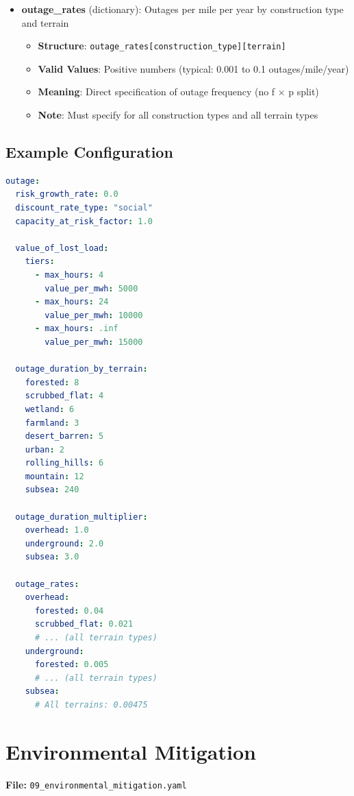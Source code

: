 \documentclass[ctcc_full_documentation.tex]{subfiles}
\begin{document}
\begin{itemize}
    \item \textbf{outage\_rates} (dictionary): Outages per mile per year by construction type and terrain
    \begin{itemize}
        \item \textbf{Structure}: \texttt{outage\_rates[construction\_type][terrain]}
        \item \textbf{Valid Values}: Positive numbers (typical: 0.001 to 0.1 outages/mile/year)
        \item \textbf{Meaning}: Direct specification of outage frequency (no f × p split)
        \item \textbf{Note}: Must specify for all construction types and all terrain types
    \end{itemize}
\end{itemize}

\subsection{Example Configuration}

\begin{lstlisting}[language=yaml]
outage:
  risk_growth_rate: 0.0
  discount_rate_type: "social"
  capacity_at_risk_factor: 1.0

  value_of_lost_load:
    tiers:
      - max_hours: 4
        value_per_mwh: 5000
      - max_hours: 24
        value_per_mwh: 10000
      - max_hours: .inf
        value_per_mwh: 15000

  outage_duration_by_terrain:
    forested: 8
    scrubbed_flat: 4
    wetland: 6
    farmland: 3
    desert_barren: 5
    urban: 2
    rolling_hills: 6
    mountain: 12
    subsea: 240

  outage_duration_multiplier:
    overhead: 1.0
    underground: 2.0
    subsea: 3.0

  outage_rates:
    overhead:
      forested: 0.04
      scrubbed_flat: 0.021
      # ... (all terrain types)
    underground:
      forested: 0.005
      # ... (all terrain types)
    subsea:
      # All terrains: 0.00475
\end{lstlisting}

\section{Environmental Mitigation}
\label{sec:environmental}

\textbf{File:} \texttt{09\_environmental\_mitigation.yaml}
\end{document}
